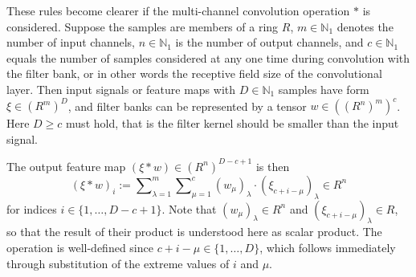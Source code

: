 \documentclass[journal]{IEEEtran}
\newcommand{\N}{\mathbb{N}}
\newcommand{\conv}{\ast}
\newcommand{\discint}[2]{\{#1,\dotsc,#2\}}
\newcommand{\inint}[2]{\in\discint{#1}{#2}}
\begin{document}
These rules become clearer if the multi-channel convolution operation $\conv$ is considered.
Suppose the samples are members of a ring $R$, $m\in\N_1$ denotes the number of input channels, $n\in\N_1$ is the number of output channels, and $c\in\N_1$ equals the number of samples considered at any one time during convolution with the filter bank, or in other words the receptive field size of the convolutional layer.
Then input signals or feature maps with $D\in\N_1$ samples have form $\xi\in(R^m)^D$, and filter banks can be represented by a tensor $w\in((R^n)^m)^c$.
Here $D\geq c$ must hold, that is the filter kernel should be smaller than the input signal.

The output feature map $(\xi\conv w)\in(R^n)^{D - c + 1}$ is then
\begin{displaymath}
  (\xi\conv w)_i := \sum\nolimits_{\lambda = 1}^m\sum\nolimits_{\mu = 1}^c (w_\mu)_\lambda \cdot (\xi_{c + i - \mu})_\lambda \in R^n
\end{displaymath}
for indices $i\inint{1}{D - c + 1}$.
Note that $(w_\mu)_\lambda\in R^n$ and $(\xi_{c + i - \mu})_\lambda\in R$, so that the result of their product is understood here as scalar product.
The operation is well-defined since $c + i - \mu\inint{1}{D}$, which follows immediately through substitution of the extreme values of $i$ and $\mu$.
\end{document}
